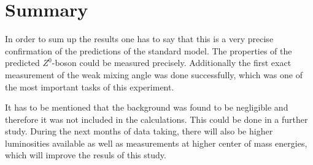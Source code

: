 \documentclass[epj,nopacs]{svjour}
\begin{document}
\section{ Summary}
In order to sum up the results one has to say that this is a very precise
confirmation of the predictions of the standard model. The properties of the
predicted $Z^0$-boson could be measured precisely. Additionally the first exact
measurement of the weak mixing angle was done successfully, which was one of the
most important tasks of this experiment.

It has to be mentioned that the background was found to be negligible and
therefore it was not included in the calculations. This could be done in a
further study. During the next months of data taking, there will also be higher
luminosities available as well as measurements at higher center of mass
energies, which will improve the resuls of this study.

% 
% 

% 
\end{document}
